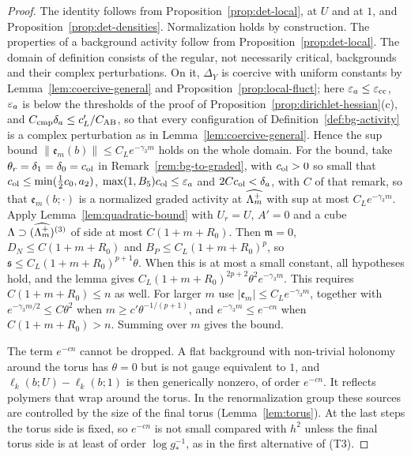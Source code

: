 \begin{proof}
The identity follows from Proposition~\ref{prop:det-local}, at $U$ and at $1$, and Proposition~\ref{prop:det-densities}. Normalization holds by construction. The properties of a background activity follow from Proposition~\ref{prop:det-local}. The domain of definition consists of the regular, not necessarily critical, backgrounds and their complex perturbations. On it, $\Delta_Y$ is coercive with uniform constants by Lemma~\ref{lem:coercive-general} and Proposition~\ref{prop:local-fluct}; here $\varepsilon_a\le\varepsilon_{\rm cc}$, $\varepsilon_a$ is below the thresholds of the proof of Proposition~\ref{prop:dirichlet-hessian}(c), and $C_{\rm cmp}\delta_a\le c'_L/C_{\rm AB}$, so that every configuration of Definition~\ref{def:bg-activity} is a complex perturbation as in Lemma~\ref{lem:coercive-general}. Hence the sup bound $\|\mathfrak e_m(b)\|\le C_Le^{-\gamma_3m}$ holds on the whole domain. For the bound, take $\theta_r=\delta_1=\delta_0=c_{\rm ol}$ in Remark~\ref{rem:bg-to-graded}, with $c_{\rm ol}>0$ so small that $c_{\rm ol}\le\min(\frac12c_0,a_2)$, $\max(1,B_5)c_{\rm ol}\le\varepsilon_a$ and $2Cc_{\rm ol}<\delta_a$, with $C$ of that remark, so that $\mathfrak e_m(b;\cdot)$ is a normalized graded activity at $\widehat{\Lambda_m^+}$ with sup at most $C_Le^{-\gamma_3m}$. Apply Lemma~\ref{lem:quadratic-bound} with $U_r=U$, $A'=0$ and a cube $\Lambda\supset(\widehat{\Lambda_m^+})^{(3)}$ of side at most $C(1+m+R_0)$. Then $\mathfrak m=0$, $D_N\le C(1+m+R_0)$ and $B_P\le C_L(1+m+R_0)^p$, so $\mathfrak s\le C_L(1+m+R_0)^{p+1}\theta$. When this is at most a small constant, all hypotheses hold, and the lemma gives $C_L(1+m+R_0)^{2p+2}\theta^2e^{-\gamma_3m}$. This requires $C(1+m+R_0)\le n$ as well. For larger $m$ use $|\mathfrak e_m|\le C_Le^{-\gamma_3m}$, together with $e^{-\gamma_3m/2}\le C\theta^2$ when $m\ge c'\theta^{-1/(p+1)}$, and $e^{-\gamma_3m}\le e^{-cn}$ when $C(1+m+R_0)>n$. Summing over $m$ gives the bound.

The term $e^{-cn}$ cannot be dropped. A flat background with non-trivial holonomy around the torus has $\theta=0$ but is not gauge equivalent to $1$, and $\ell_k(b;U)-\ell_k(b;1)$ is then generically nonzero, of order $e^{-cn}$. It reflects polymers that wrap around the torus. In the renormalization group these sources are controlled by the size of the final torus (Lemma~\ref{lem:torus}). At the last steps the torus side is fixed, so $e^{-cn}$ is not small compared with $h^2$ unless the final torus side is at least of order $\log g_*^{-1}$, as in the first alternative of (T3).
\end{proof}

